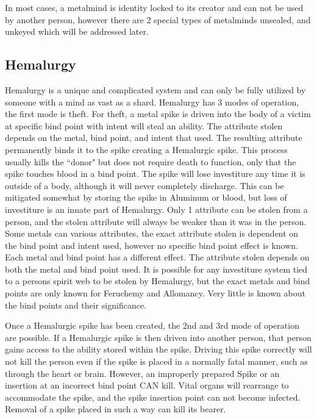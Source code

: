 \documentclass[conference]{IEEEtran}
\begin{document}
In most cases, a metalmind is identity locked to its creator and can not be used by another person, however there are 2 special types of metalminds unsealed, and unkeyed which will be addressed later.\cite{BoM-CH3} 
\subsection*{Hemalurgy}
Hemalurgy is a unique and complicated system and can only be fully utilized by someone with a mind as vast as a shard.\cite{WoF}  Hemalurgy has 3 modes of operation, the first mode is theft.  For theft, a metal spike is driven into the body of a victim at specific bind point with intent will steal an ability.\cite{WoF}  The attribute stolen depends on the metal\cite{WoF}, bind point\cite{WoB-holiday}, and intent\cite{HE-intent} that used.  The resulting attribute permanently binds it to the spike creating a Hemalurgic spike.\cite{ARS}  This process usually kills the ``donor" but does not require death to function,\cite{noDeath} only that the spike touches blood in a bind point.  The spike will lose investiture any time it is outside of a body, although it will never completely discharge.\cite{HoA-CH34}\cite{WoF}  This can be mitigated somewhat by storing the spike in Aluminum\cite{anti-decay-aluminum} or blood,\cite{anti-decay-blood} but loss of investiture is an innate part of Hemalurgy.\cite{WoF}  Only 1 attribute can be stolen from a person,\cite{HE-only1} and the stolen attribute will always be weaker than it was in the person.\cite{HoA-CH34}  Some metals can various attributes, the exact attribute stolen is dependent on the bind point\cite{WoB-holiday} and intent\cite{HE-intent} used, however no specific bind point effect is known.
Each metal and bind point has a different effect.  The attribute stolen depends on both the metal and bind point used\cite{WoF}.  It is possible for any investiture system tied to a persons spirit web to be stolen by Hemalurgy, but the exact metals and bind points are only known for Feruchemy and Allomancy.\cite{HE-universal}  Very little is known about the bind points and their significance.

Once a Hemalurgic spike has been created, the 2nd and 3rd mode of operation are possible.  If a Hemalurgic spike is then driven into another person, that person gains access to the ability stored within the spike.\cite{ARS}  Driving this spike correctly will not kill the person even if the spike is placed in a normally fatal manner, such as through the heart or brain.\cite{TFE-CH2}  However, an improperly prepared Spike or an insertion at an incorrect bind point CAN kill.  Vital organs will rearrange to accommodate the spike,\cite{WoF} and the spike insertion point can not become infected.\cite{noInfect}  Removal of a spike placed in such a way can kill its bearer.\cite{HoA-CH42}  
\end{document}
